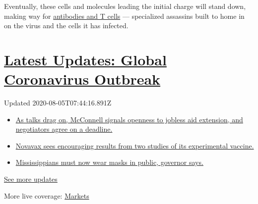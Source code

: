 Eventually, these cells and molecules leading the initial charge will
stand down, making way for
\href{https://www.nytimes.com/2020/07/26/health/coronvirus-antibody-tests.html}{antibodies
and T cells} --- specialized assassins built to home in on the virus and
the cells it has infected.

\hypertarget{latest-updates-global-coronavirus-outbreak}{%
\section{\texorpdfstring{\href{https://www.nytimes.com/2020/08/04/world/coronavirus-cases.html?action=click\&pgtype=Article\&state=default\&region=MAIN_CONTENT_1\&context=storylines_live_updates}{Latest
Updates: Global Coronavirus
Outbreak}}{Latest Updates: Global Coronavirus Outbreak}}\label{latest-updates-global-coronavirus-outbreak}}

Updated 2020-08-05T07:44:16.891Z

\begin{itemize}
\tightlist
\item
  \href{https://www.nytimes.com/2020/08/04/world/coronavirus-cases.html?action=click\&pgtype=Article\&state=default\&region=MAIN_CONTENT_1\&context=storylines_live_updates\#link-762df92}{As
  talks drag on, McConnell signals openness to jobless aid extension,
  and negotiators agree on a deadline.}
\item
  \href{https://www.nytimes.com/2020/08/04/world/coronavirus-cases.html?action=click\&pgtype=Article\&state=default\&region=MAIN_CONTENT_1\&context=storylines_live_updates\#link-1228a480}{Novavax
  sees encouraging results from two studies of its experimental
  vaccine.}
\item
  \href{https://www.nytimes.com/2020/08/04/world/coronavirus-cases.html?action=click\&pgtype=Article\&state=default\&region=MAIN_CONTENT_1\&context=storylines_live_updates\#link-794484ed}{Mississippians
  must now wear masks in public, governor says.}
\end{itemize}

\href{https://www.nytimes.com/2020/08/04/world/coronavirus-cases.html?action=click\&pgtype=Article\&state=default\&region=MAIN_CONTENT_1\&context=storylines_live_updates}{See
more updates}

More live coverage:
\href{https://www.nytimes.com/live/2020/08/04/business/stock-market-today-coronavirus?action=click\&pgtype=Article\&state=default\&region=MAIN_CONTENT_1\&context=storylines_live_updates}{Markets}

